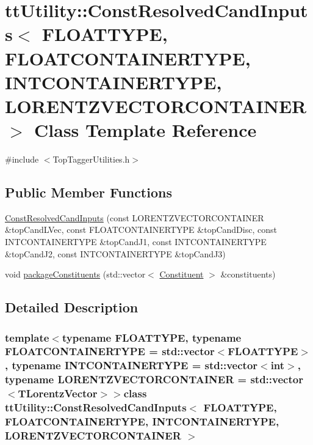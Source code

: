 \hypertarget{classttUtility_1_1ConstResolvedCandInputs}{\section{tt\-Utility\-:\-:Const\-Resolved\-Cand\-Inputs$<$ F\-L\-O\-A\-T\-T\-Y\-P\-E, F\-L\-O\-A\-T\-C\-O\-N\-T\-A\-I\-N\-E\-R\-T\-Y\-P\-E, I\-N\-T\-C\-O\-N\-T\-A\-I\-N\-E\-R\-T\-Y\-P\-E, L\-O\-R\-E\-N\-T\-Z\-V\-E\-C\-T\-O\-R\-C\-O\-N\-T\-A\-I\-N\-E\-R $>$ Class Template Reference}
\label{classttUtility_1_1ConstResolvedCandInputs}
}


{\ttfamily \#include $<$Top\-Tagger\-Utilities.\-h$>$}

\subsection*{Public Member Functions}
\begin{DoxyCompactItemize}
\item 
\hyperlink{classttUtility_1_1ConstResolvedCandInputs_a7478c472a557e444c5de4f17fd29fa22}{Const\-Resolved\-Cand\-Inputs} (const L\-O\-R\-E\-N\-T\-Z\-V\-E\-C\-T\-O\-R\-C\-O\-N\-T\-A\-I\-N\-E\-R \&top\-Cand\-L\-Vec, const F\-L\-O\-A\-T\-C\-O\-N\-T\-A\-I\-N\-E\-R\-T\-Y\-P\-E \&top\-Cand\-Disc, const I\-N\-T\-C\-O\-N\-T\-A\-I\-N\-E\-R\-T\-Y\-P\-E \&top\-Cand\-J1, const I\-N\-T\-C\-O\-N\-T\-A\-I\-N\-E\-R\-T\-Y\-P\-E \&top\-Cand\-J2, const I\-N\-T\-C\-O\-N\-T\-A\-I\-N\-E\-R\-T\-Y\-P\-E \&top\-Cand\-J3)
\item 
void \hyperlink{classttUtility_1_1ConstResolvedCandInputs_a064297d644dcf43301fcb74dc6ba299f}{package\-Constituents} (std\-::vector$<$ \hyperlink{classConstituent}{Constituent} $>$ \&constituents)
\end{DoxyCompactItemize}


\subsection{Detailed Description}
\subsubsection*{template$<$typename F\-L\-O\-A\-T\-T\-Y\-P\-E, typename F\-L\-O\-A\-T\-C\-O\-N\-T\-A\-I\-N\-E\-R\-T\-Y\-P\-E = std\-::vector$<$\-F\-L\-O\-A\-T\-T\-Y\-P\-E$>$, typename I\-N\-T\-C\-O\-N\-T\-A\-I\-N\-E\-R\-T\-Y\-P\-E = std\-::vector$<$int$>$, typename L\-O\-R\-E\-N\-T\-Z\-V\-E\-C\-T\-O\-R\-C\-O\-N\-T\-A\-I\-N\-E\-R = std\-::vector$<$\-T\-Lorentz\-Vector$>$$>$class tt\-Utility\-::\-Const\-Resolved\-Cand\-Inputs$<$ F\-L\-O\-A\-T\-T\-Y\-P\-E, F\-L\-O\-A\-T\-C\-O\-N\-T\-A\-I\-N\-E\-R\-T\-Y\-P\-E, I\-N\-T\-C\-O\-N\-T\-A\-I\-N\-E\-R\-T\-Y\-P\-E, L\-O\-R\-E\-N\-T\-Z\-V\-E\-C\-T\-O\-R\-C\-O\-N\-T\-A\-I\-N\-E\-R $>$}

